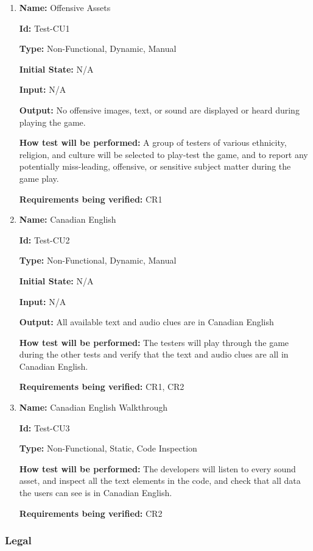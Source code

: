 \documentclass[12pt, titlepage]{article}
\begin{document}
\begin{enumerate}

\item{\textbf{Name:} Offensive Assets}

\textbf{Id:} Test-CU1

\textbf{Type:} Non-Functional, Dynamic, Manual
					
\textbf{Initial State:} N/A
					
\textbf{Input:} N/A
					
\textbf{Output:} No offensive images, text, or sound are displayed or heard during playing the game.
					
\textbf{How test will be performed:} A group of testers of various ethnicity, religion, and culture will be selected to play-test the game, and to report any potentially miss-leading, offensive, or sensitive subject matter during the game play.  

\textbf{Requirements being verified:} CR1
					
\item{\textbf{Name:} Canadian English}

\textbf{Id:} Test-CU2

\textbf{Type:} Non-Functional, Dynamic, Manual
					
\textbf{Initial State:} N/A
					
\textbf{Input:} N/A
					
\textbf{Output:} All available text and audio clues are in Canadian English
					
\textbf{How test will be performed:} The testers will play through the game during the other tests and verify that the text and audio clues are all in Canadian English. 

\textbf{Requirements being verified:} CR1, CR2

\item{\textbf{Name:} Canadian English Walkthrough}

\textbf{Id:} Test-CU3

\textbf{Type:} Non-Functional, Static, Code Inspection
									
\textbf{How test will be performed:} The developers will listen to every sound asset, and inspect all the text elements in the code, and check that all data the users can see is in Canadian English.

\textbf{Requirements being verified:} CR2

\end{enumerate}

\subsubsection{Legal}
\end{document}
